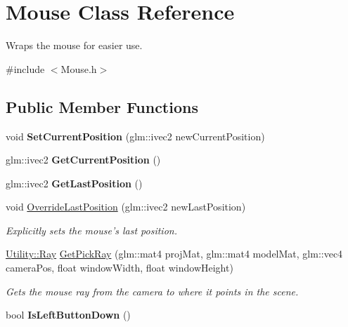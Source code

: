 \hypertarget{class_mouse}{\section{Mouse Class Reference}
\label{class_mouse}
}


Wraps the mouse for easier use.  




{\ttfamily \#include $<$Mouse.\-h$>$}

\subsection*{Public Member Functions}
\begin{DoxyCompactItemize}
\item 
\hypertarget{class_mouse_afee1b7d612e7632ec2a13c6e9a7c31f4}{void {\bfseries Set\-Current\-Position} (glm\-::ivec2 new\-Current\-Position)}\label{class_mouse_afee1b7d612e7632ec2a13c6e9a7c31f4}

\item 
\hypertarget{class_mouse_a1840d549c107579e678286982aae6498}{glm\-::ivec2 {\bfseries Get\-Current\-Position} ()}\label{class_mouse_a1840d549c107579e678286982aae6498}

\item 
\hypertarget{class_mouse_a284d521b30efc3b104f2a27634a40894}{glm\-::ivec2 {\bfseries Get\-Last\-Position} ()}\label{class_mouse_a284d521b30efc3b104f2a27634a40894}

\item 
\hypertarget{class_mouse_a3baac6afa701c4e31e79dea52ca4088d}{void \hyperlink{class_mouse_a3baac6afa701c4e31e79dea52ca4088d}{Override\-Last\-Position} (glm\-::ivec2 new\-Last\-Position)}\label{class_mouse_a3baac6afa701c4e31e79dea52ca4088d}

\begin{DoxyCompactList}\small\item\em Explicitly sets the mouse's last position. \end{DoxyCompactList}\item 
\hyperlink{class_utility_1_1_ray}{Utility\-::\-Ray} \hyperlink{class_mouse_ad12226927b4d8e75975dc1baa7639461}{Get\-Pick\-Ray} (glm\-::mat4 proj\-Mat, glm\-::mat4 model\-Mat, glm\-::vec4 camera\-Pos, float window\-Width, float window\-Height)
\begin{DoxyCompactList}\small\item\em Gets the mouse ray from the camera to where it points in the scene. \end{DoxyCompactList}\item 
\hypertarget{class_mouse_a330a154b3f3d79c5b81dc8bc4bf61deb}{bool {\bfseries Is\-Left\-Button\-Down} ()}\label{class_mouse_a330a154b3f3d79c5b81dc8bc4bf61deb}


\end{DoxyCompactItemize}
